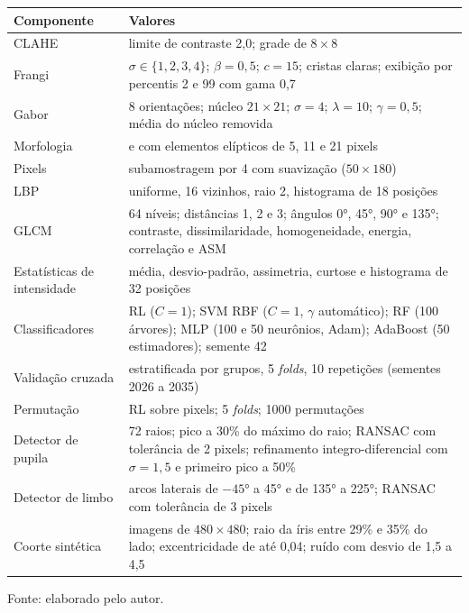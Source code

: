 \begin{quadro}[htb]
  \caption{Parâmetros dos realces, dos descritores e dos experimentos}
  \label{qua:parametros}
  \footnotesize
  \begin{tabular}{p{4.4cm}p{9.8cm}}
    \toprule
    Componente & Valores \\
    \midrule
    CLAHE & limite de contraste 2,0; grade de $8\times8$ \\
    Frangi & $\sigma\in\{1,2,3,4\}$; $\beta=0{,}5$; $c=15$; cristas claras;
      exibição por percentis 2 e 99 com gama 0,7 \\
    Gabor & 8 orientações; núcleo $21\times21$; $\sigma=4$;
      $\lambda=10$; $\gamma=0{,}5$; média do núcleo removida \\
    Morfologia & \tht{} e \bh{} com elementos elípticos de 5, 11 e 21 pixels \\
    Pixels & subamostragem por 4 com suavização ($50\times180$) \\
    LBP & uniforme, 16 vizinhos, raio 2, histograma de 18 posições \\
    GLCM & 64 níveis; distâncias 1, 2 e 3; ângulos 0°, 45°, 90° e 135°;
      contraste, dissimilaridade, homogeneidade, energia, correlação e ASM \\
    Estatísticas de intensidade & média, desvio-padrão, assimetria, curtose e
      histograma de 32 posições \\
    Classificadores & RL ($C=1$); SVM RBF ($C=1$, $\gamma$ automático); RF
      (100 árvores); MLP (100 e 50 neurônios, Adam); AdaBoost (50
      estimadores); semente 42 \\
    Validação cruzada & estratificada por grupos, 5 \emph{folds}, 10
      repetições (sementes 2026 a 2035) \\
    Permutação & RL sobre pixels; 5 \emph{folds}; 1000 permutações \\
    Detector de pupila & 72 raios; pico a 30\% do máximo do raio; RANSAC com
      tolerância de 2 pixels; refinamento integro-diferencial com $\sigma=1{,}5$
      e primeiro pico a 50\% \\
    Detector de limbo & arcos laterais de $-45$° a 45° e de 135° a 225°;
      RANSAC com tolerância de 3 pixels \\
    Coorte sintética & imagens de $480\times480$; raio da íris entre 29\% e 35\%
      do lado; excentricidade de até 0,04; ruído com desvio de 1,5 a 4,5 \\
    \bottomrule
  \end{tabular}
  \par\medskip
  \footnotesize Fonte: elaborado pelo autor.
\end{quadro}
